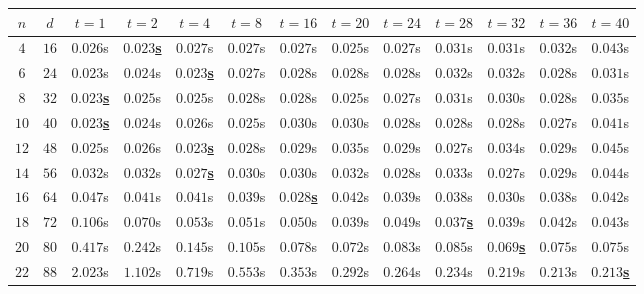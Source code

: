 \begin{table}[ht]
    \centering
    \begin{adjustwidth}{-1.6cm}{-1.6cm}
    {\renewcommand{\arraystretch}{1.05}
        \setlength{\tabcolsep}{2.5pt}
        \small
        \begin{tabular}{ccccccccccccc}
            $n$ & $d$ & $t = 1$ & $t = 2$ & $t = 4$ & $t = 8$ & $t = 16$ & $t = 20$ & $t = 24$ & $t = 28$ & $t = 32$ & $t = 36$ & $t = 40$ \\
            \hline
            $4$ & $16$ & $0.026$s & \underline{$\mathbf{0.023}$\textbf{s}} & $0.027$s & $0.027$s & $0.027$s & $0.025$s & $0.027$s & $0.031$s & $0.031$s & $0.032$s & $0.043$s \\
            $6$ & $24$ & $0.023$s & $0.024$s & \underline{$\mathbf{0.023}$\textbf{s}} & $0.027$s & $0.028$s & $0.028$s & $0.028$s & $0.032$s & $0.032$s & $0.028$s & $0.031$s \\
            $8$ & $32$ & \underline{$\mathbf{0.023}$\textbf{s}} & $0.025$s & $0.025$s & $0.028$s & $0.028$s & $0.025$s & $0.027$s & $0.031$s & $0.030$s & $0.028$s & $0.035$s \\
            $10$ & $40$ & \underline{$\mathbf{0.023}$\textbf{s}} & $0.024$s & $0.026$s & $0.025$s & $0.030$s & $0.030$s & $0.028$s & $0.028$s & $0.028$s & $0.027$s & $0.041$s \\
            $12$ & $48$ & $0.025$s & $0.026$s & \underline{$\mathbf{0.023}$\textbf{s}} & $0.028$s & $0.029$s & $0.035$s & $0.029$s & $0.027$s & $0.034$s & $0.029$s & $0.045$s \\
            $14$ & $56$ & $0.032$s & $0.032$s & \underline{$\mathbf{0.027}$\textbf{s}} & $0.030$s & $0.030$s & $0.032$s & $0.028$s & $0.033$s & $0.027$s & $0.029$s & $0.044$s \\
            $16$ & $64$ & $0.047$s & $0.041$s & $0.041$s & $0.039$s & \underline{$\mathbf{0.028}$\textbf{s}} & $0.042$s & $0.039$s & $0.038$s & $0.030$s & $0.038$s & $0.042$s \\
            $18$ & $72$ & $0.106$s & $0.070$s & $0.053$s & $0.051$s & $0.050$s & $0.039$s & $0.049$s & \underline{$\mathbf{0.037}$\textbf{s}} & $0.039$s & $0.042$s & $0.043$s \\
            $20$ & $80$ & $0.417$s & $0.242$s & $0.145$s & $0.105$s & $0.078$s & $0.072$s & $0.083$s & $0.085$s & \underline{$\mathbf{0.069}$\textbf{s}} & $0.075$s & $0.075$s \\
            $22$ & $88$ & $2.023$s & $1.102$s & $0.719$s & $0.553$s & $0.353$s & $0.292$s & $0.264$s & $0.234$s & $0.219$s & $0.213$s & \underline{$\mathbf{0.213}$\textbf{s}} \\

\end{tabular}}
\end{adjustwidth}
\end{table}
